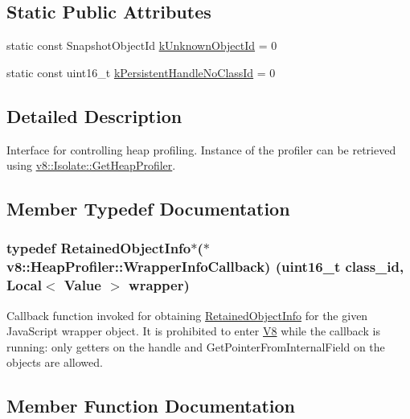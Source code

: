 \subsection*{Static Public Attributes}
\begin{DoxyCompactItemize}
\item 
static const Snapshot\+Object\+Id \hyperlink{classv8_1_1HeapProfiler_abf2b9d8facb18473f9b124ab8baf5786}{k\+Unknown\+Object\+Id} = 0
\item 
static const uint16\+\_\+t \hyperlink{classv8_1_1HeapProfiler_a272c9af3ea5cd90a2737af3d22a7eb78}{k\+Persistent\+Handle\+No\+Class\+Id} = 0
\end{DoxyCompactItemize}


\subsection{Detailed Description}
Interface for controlling heap profiling. Instance of the profiler can be retrieved using \hyperlink{classv8_1_1Isolate_a9c48259615e8370f6f0efd27cd7f99a6}{v8\+::\+Isolate\+::\+Get\+Heap\+Profiler}. 

\subsection{Member Typedef Documentation}
\hypertarget{classv8_1_1HeapProfiler_a677025dd201fd832e0464e5ab0b0d0d4}{}
\subsubsection[{Wrapper\+Info\+Callback}]{\setlength{\rightskip}{0pt plus 5cm}typedef {\bf Retained\+Object\+Info}$\ast$($\ast$ v8\+::\+Heap\+Profiler\+::\+Wrapper\+Info\+Callback) (uint16\+\_\+t class\+\_\+id, {\bf Local}$<$ {\bf Value} $>$ wrapper)}\label{classv8_1_1HeapProfiler_a677025dd201fd832e0464e5ab0b0d0d4}
Callback function invoked for obtaining \hyperlink{classv8_1_1RetainedObjectInfo}{Retained\+Object\+Info} for the given Java\+Script wrapper object. It is prohibited to enter \hyperlink{classv8_1_1V8}{V8} while the callback is running\+: only getters on the handle and Get\+Pointer\+From\+Internal\+Field on the objects are allowed. 

\subsection{Member Function Documentation}
\hypertarget{classv8_1_1HeapProfiler_a8a90c630543ed1875cbf9166239ff8d3}{}
